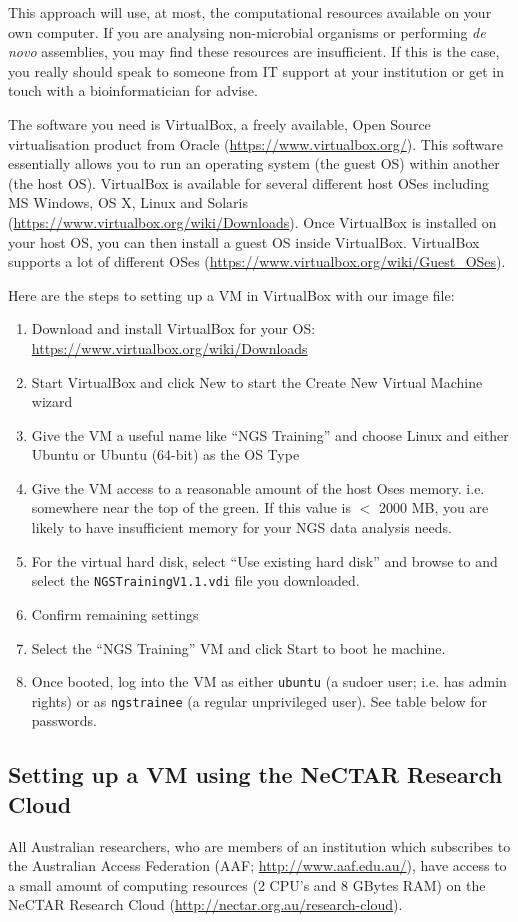 This approach will use, at most, the computational resources available on
your own computer. If you are analysing non-microbial organisms or performing
\textit{de novo} assemblies, you may find these resources are insufficient. If this is the
case, you really should speak to someone from IT support at your institution or
get in touch with a bioinformatician for advise.

The software you need is VirtualBox, a freely available, Open Source
virtualisation product from Oracle (\url{https://www.virtualbox.org/}). This
software essentially allows you to run an operating system (the guest OS) within
another (the host OS). VirtualBox is available for several different host OSes
including MS Windows, OS X, Linux and Solaris
(\url{https://www.virtualbox.org/wiki/Downloads}). Once VirtualBox is installed
on your host OS, you can then install a guest OS inside VirtualBox. VirtualBox
supports a lot of different OSes
(\url{https://www.virtualbox.org/wiki/Guest_OSes}).

Here are the steps to setting up a VM in VirtualBox with our image file:
\begin{enumerate}
  \item Download and install VirtualBox for your OS: 
  \url{https://www.virtualbox.org/wiki/Downloads}
  \item Start VirtualBox and click New to start the Create New Virtual Machine wizard
  \item Give the VM a useful name like ``NGS Training'' and choose Linux and
  either Ubuntu or Ubuntu (64-bit) as the OS Type
  \item Give the VM access to a reasonable amount of the host Oses memory. i.e.
  somewhere near the top of the green. If this value is $<$ 2000 MB, you are
  likely to have insufficient memory for your NGS data analysis needs.
  \item For the virtual hard disk, select ``Use existing hard disk'' and browse
  to and select the \texttt{NGSTrainingV1.1.vdi} file you downloaded.
  \item Confirm remaining settings
  \item Select the ``NGS Training'' VM and click Start to boot he machine.
  \item Once booted, log into the VM as either \texttt{ubuntu} (a sudoer user;
  i.e. has admin rights) or as \texttt{ngstrainee} (a regular unprivileged
  user). See table below for passwords.
\end{enumerate}


\subsection{Setting up a VM using the NeCTAR Research Cloud}
All Australian researchers, who are members of an institution which subscribes
to the Australian Access Federation (AAF; \url{http://www.aaf.edu.au/}), have
access to a small amount of computing resources (2 CPU's and 8 GBytes RAM) on
the NeCTAR Research Cloud (\url{http://nectar.org.au/research-cloud}).

